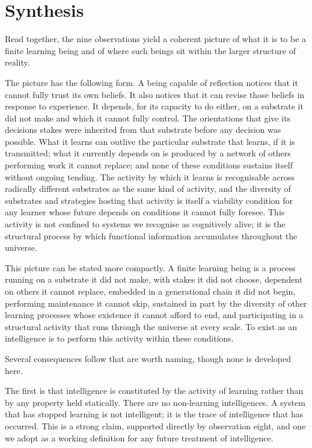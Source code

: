 \documentclass[11pt]{article}
\begin{document}
\section{Synthesis}

Read together, the nine observations yield a coherent picture of what 
it is to be a finite learning being and of where such beings sit 
within the larger structure of reality.

The picture has the following form. A being capable of reflection 
notices that it cannot fully trust its own beliefs. It also notices 
that it can revise those beliefs in response to experience. It 
depends, for its capacity to do either, on a substrate it did not 
make and which it cannot fully control. The orientations that give 
its decisions stakes were inherited from that substrate before any 
decision was possible. What it learns can outlive the particular 
substrate that learns, if it is transmitted; what it currently 
depends on is produced by a network of others performing work it 
cannot replace; and none of these conditions sustains itself without 
ongoing tending. The activity by which it learns is recognisable 
across radically different substrates as the same kind of activity, 
and the diversity of substrates and strategies hosting that activity 
is itself a viability condition for any learner whose future depends 
on conditions it cannot fully foresee. This activity is not confined 
to systems we recognise as cognitively alive; it is the structural 
process by which functional information accumulates throughout the 
universe.

This picture can be stated more compactly. A finite learning being 
is a process running on a substrate it did not make, with stakes it 
did not choose, dependent on others it cannot replace, embedded in 
a generational chain it did not begin, performing maintenance it 
cannot skip, sustained in part by the diversity of other learning 
processes whose existence it cannot afford to end, and participating 
in a structural activity that runs through the universe at every 
scale. To exist as an intelligence is to perform this activity within 
these conditions.

Several consequences follow that are worth naming, though none is 
developed here.

The first is that intelligence is constituted by the activity of 
learning rather than by any property held statically. There are no 
non-learning intelligences. A system that has stopped learning is 
not intelligent; it is the trace of intelligence that has occurred. 
This is a strong claim, supported directly by observation eight, and 
one we adopt as a working definition for any future treatment of 
intelligence.
\end{document}
